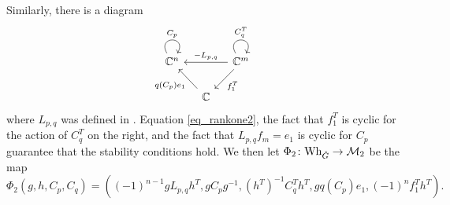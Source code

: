 \documentclass[11pt]{article}
\theoremstyle{definition}
\theoremstyle{plain}
\theoremstyle{remark}
\newcommand{\numberset}{\mathbb}
\newcommand{\C}{\numberset{C}}
\begin{document}
        Similarly, there is a diagram
        \[
            \begin{tikzcd}[column sep = small]
                \C^n  \arrow[out=120,in=60,loop,looseness=5,"C_p"] & & \C^m \arrow[ll, "-L_{p,q}"']\arrow[out=120,in=60,loop,looseness=5,"C_q^T"] \arrow[ld, "f_1^T"] \\
                & \C \arrow[lu, "q(C_p)e_1"]& 
            \end{tikzcd}
        \]
        where $L_{p,q}$ was defined in . Equation \eqref{eq_rankone2}, the fact that $f_1^T$ is cyclic for the action of $C_q^T$ on the right, and the fact that $L_{p,q}f_m=e_1$ is cyclic for $C_p$ guarantee that the stability conditions hold. We then let $\Phi_2\colon \mathrm{Wh}_{\Check{G}} \to \mathcal{M}_2$ be the map
        \begin{equation}\label{eq-phi2}
            \Phi_2(g,h,C_p,C_q) = ((-1)^{n-1}gL_{p,q}h^T, gC_pg^{-1}, (h^T)^{-1}C_q^Th^T, gq(C_p)e_1,(-1)^nf_1^Th^T).
        \end{equation}
\end{document}
